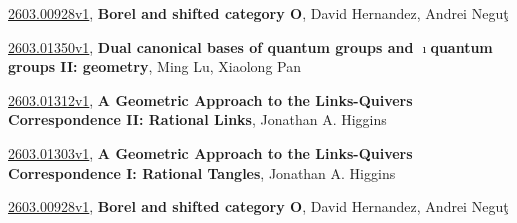 \documentclass[9pt, a4paper]{article}
\theoremstyle{plain}
\theoremstyle{definition}
\theoremstyle{remark}
\newcommand{\arxiv}[3]{\href{https://arxiv.org/abs/#1}{#1}, \textbf{\textcolor{arxivblue}{#2}}, #3}
\begin{document}
\arxiv{2603.00928v1}{Borel and shifted category O}{David Hernandez, Andrei Neguţ}

\arxiv{2603.01350v1}{Dual canonical bases of quantum groups and $\imath$quantum groups II: geometry}{Ming Lu, Xiaolong Pan}

\arxiv{2603.01312v1}{A Geometric Approach to the Links-Quivers Correspondence II: Rational Links}{Jonathan A. Higgins}

\arxiv{2603.01303v1}{A Geometric Approach to the Links-Quivers Correspondence I: Rational Tangles}{Jonathan A. Higgins}

\arxiv{2603.00928v1}{Borel and shifted category O}{David Hernandez, Andrei Neguţ}

\end{document}
